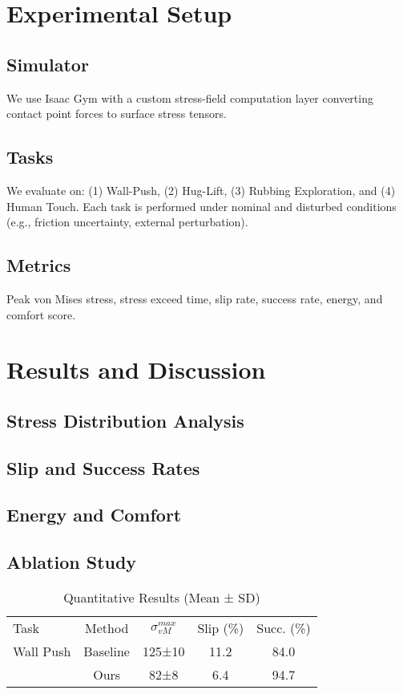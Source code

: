 \documentclass[titlepage]{ltjsarticle}
\begin{document}
\section{Experimental Setup}
\subsection{Simulator}
We use Isaac Gym with a custom stress-field computation layer converting contact point forces to surface stress tensors.
\subsection{Tasks}
We evaluate on:
(1) Wall-Push, (2) Hug-Lift, (3) Rubbing Exploration, and (4) Human Touch.
Each task is performed under nominal and disturbed conditions (e.g., friction uncertainty, external perturbation).
\subsection{Metrics}
Peak von Mises stress, stress exceed time, slip rate, success rate, energy, and comfort score.

\section{Results and Discussion}
\subsection{Stress Distribution Analysis}
\subsection{Slip and Success Rates}
\subsection{Energy and Comfort}
\subsection{Ablation Study}

\begin{table}[t]
\centering
\caption{Quantitative Results (Mean ± SD)}
\begin{tabular}{lcccc}

Task & Method & $\sigma_{vM}^{max}$ & Slip (\%) & Succ. (\%)\\

Wall Push & Baseline & 125±10 & 11.2 & 84.0\\
          & Ours & 82±8 & 6.4 & 94.7\\

\end{tabular}
\end{table}
\end{document}

